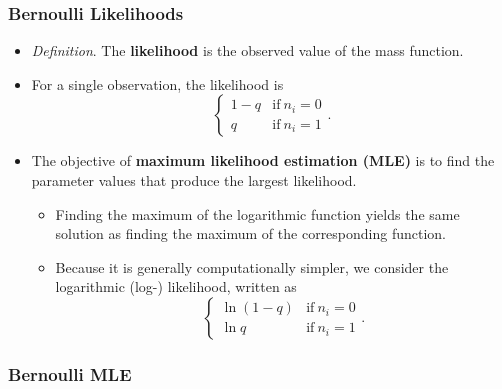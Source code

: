 \documentclass[]{book}
\begin{document}
\subsubsection{Bernoulli Likelihoods}\label{bernoulli-likelihoods}

\begin{itemize}
\item
  \emph{Definition}. The \textbf{likelihood} is the observed value of
  the mass function.
\item
  For a single observation, the likelihood is \[\left\{
  \begin{array}{ll}
  1-q & \mathrm{if}\ n_i=0 \\
  q   & \mathrm{if}\ n_i=1
  \end{array}
  \right. .\]
\item
  The objective of \textbf{maximum likelihood estimation (MLE)} is to
  find the parameter values that produce the largest likelihood.

  \begin{itemize}
  \item
    Finding the maximum of the logarithmic function yields the same
    solution as finding the maximum of the corresponding function.
  \item
    Because it is generally computationally simpler, we consider the
    logarithmic (log-) likelihood, written as \[\left\{
    \begin{array}{ll}
    \ln \left( 1-q\right)  & \mathrm{if}\ n_i=0 \\
    \ln     q              & \mathrm{if}\ n_i=1
    \end{array}\right. .\]
  \end{itemize}
\end{itemize}

\subsubsection{Bernoulli MLE}\label{bernoulli-mle}
\end{document}
